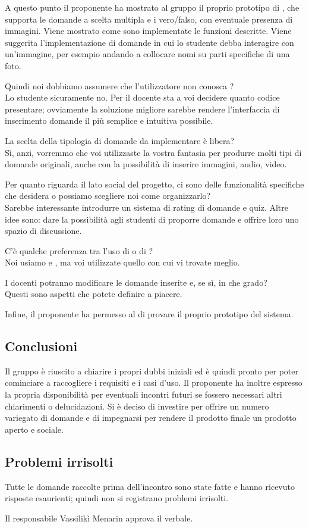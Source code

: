 \documentclass[a4paper]{article}
\def\RESPONSABILE{Vassilikì Menarin}
\begin{document}
A questo punto il proponente ha mostrato al gruppo il proprio prototipo di , che supporta le domande a scelta multipla e i vero/falso, con eventuale presenza di immagini.
Viene mostrato come sono implementate le funzioni descritte. 
Viene suggerita l'implementazione di domande in cui lo studente debba interagire con un'immagine, per esempio andando a collocare nomi su parti specifiche di una foto.

 Quindi noi dobbiamo assumere che l'utilizzatore non conosca ?
\\  Lo studente sicuramente no. Per il docente sta a voi decidere quanto codice presentare; ovviamente la soluzione migliore sarebbe rendere l'interfaccia di inserimento domande il più semplice e intuitiva possibile.

 La scelta della tipologia di domande da implementare è libera?
\\  Sì, anzi, vorremmo che voi utilizzaste la vostra fantasia per produrre molti tipi di domande originali, anche con la possibilità di inserire immagini, audio, video.

 Per quanto riguarda il lato social del progetto, ci sono delle funzionalità specifiche che desidera o possiamo scegliere noi come organizzarlo?
\\  Sarebbe interessante introdurre un sistema di rating di domande e quiz. Altre idee sono: dare la possibilità agli studenti di proporre domande e offrire loro uno spazio di discussione.

 C'è qualche preferenza tra l'uso di  o di ?
\\  Noi usiamo  e , ma voi utilizzate quello con cui vi trovate meglio.

 I docenti potranno modificare le domande inserite e, se sì, in che grado?
\\  Questi sono aspetti che potete definire a piacere.

Infine, il proponente ha permesso al  di provare il proprio prototipo del sistema.

\subsection*{Conclusioni}
Il gruppo è riuscito a chiarire i propri dubbi iniziali ed è quindi pronto per poter cominciare a raccogliere i requisiti e i casi d'uso. Il proponente ha inoltre  espresso la propria disponibilità per eventuali incontri futuri se fossero necessari altri chiarimenti o delucidazioni.
Si è deciso di investire per offrire un numero variegato di domande e di impegnarsi per rendere il prodotto finale un prodotto aperto e sociale.

\subsection*{Problemi irrisolti}
Tutte le domande raccolte prima dell'incontro sono state fatte e hanno ricevuto risposte esaurienti; quindi non si registrano problemi irrisolti.

\vspace{2cm}
Il responsabile \RESPONSABILE{} approva il verbale.
\end{document}
